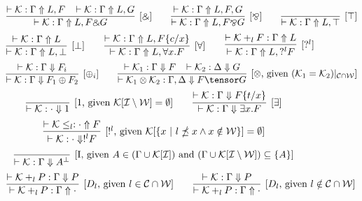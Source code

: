 \begin{figure}[t]
$$
\infer[\text{[$\binampersand$]}]{\vdash \mathcal{K} : \Gamma \Uparrow L, F
\binampersand G}{\vdash \mathcal{K} : \Gamma \Uparrow L, F \;\;\; \vdash
\mathcal{K} : \Gamma \Uparrow L, G}
\qquad
\infer[\text{[$\bindnasrepma$]}]{\vdash \mathcal{K} : \Gamma \Uparrow L, F
\bindnasrepma G}{\vdash \mathcal{K} : \Gamma \Uparrow L, F, G}
\qquad
\infer[\text{[$\top$]}]{\vdash \mathcal{K} : \Gamma \Uparrow L, \top}{}
$$
\vspace{-2.5mm}
$$
\infer[\text{[$\bot$]}]{\vdash \mathcal{K} : \Gamma \Uparrow L,
\bot}{\vdash \mathcal{K} : \Gamma \Uparrow L}
\qquad 
\infer[\text{[$\forall$]}]{\vdash \mathcal{K} : \Gamma \Uparrow L,
\forall x.F}{\vdash \mathcal{K} : \Gamma \Uparrow L, F\{c/x\}}
\qquad 
\infer[\text{[$?^l$]}]{\vdash \mathcal{K} : \Gamma \Uparrow L, ?^l
F}{\vdash \mathcal{K} +_l F : \Gamma \Uparrow L}
$$
\vspace{-2.5mm}
$$
\infer[\text{[$\oplus_i$]}]{\vdash \mathcal{K} : \Gamma \Downarrow F_1
\oplus F_2}{\vdash \mathcal{K} : \Gamma \Downarrow F_i}
\qquad
\infer[\text{[$\otimes$, given $(\mathcal{K}_1 =
\mathcal{K}_2)|_{\mathcal{C} \cap \mathcal{W}}$]}]{\vdash \mathcal{K}_1
\otimes \mathcal{K}_2 : \Gamma, \Delta \Downarrow F \tensor G}{\vdash
\mathcal{K}_1 : \Gamma \Downarrow F \;\;\; \vdash \mathcal{K}_2 : \Delta
\Downarrow G}
$$
\vspace{-2.5mm}
$$
\infer[\text{[1, given $\mathcal{K}[\mathcal{I} \setminus \mathcal{W}] =
\emptyset$]}]{\vdash \mathcal{K} : \cdot \Downarrow 1}{}
\qquad
\infer[\text{[$\exists$]}]{\vdash \mathcal{K} : \Gamma \Downarrow \exists
x.F}{\vdash \mathcal{K} : \Gamma \Downarrow F\{t/x\}}
$$
\vspace{-2.5mm}
$$
\infer[\text{[$!^l$, given $\mathcal{K}[\{x\ |\ l \npreceq x \wedge x
\notin \mathcal{W}\}] = \emptyset$]}]{\vdash \mathcal{K} : \cdot \Downarrow
!^l F}{\vdash \mathcal{K} \leq_l : \cdot \Uparrow F}
$$
\vspace{-2.5mm}
$$
\infer[\text{[I, given $A \in (\Gamma \cup
\mathcal{K}[\mathcal{I}])$ and $(\Gamma \cup \mathcal{K}[\mathcal{I}
\setminus \mathcal{W}]) \subseteq \{A\} $]}]{\vdash \mathcal{K}
: \Gamma \Downarrow A^\bot}{}
$$
\vspace{-2.5mm}
$$
\infer[\text{[$D_l$, given $l \in \mathcal{C} \cap \mathcal{W}$]}]{\vdash
\mathcal{K} +_l P : \Gamma \Uparrow \cdot}{\vdash \mathcal{K} +_l P :
\Gamma \Downarrow P}
\qquad
\infer[\text{[$D_l$, given $l \notin \mathcal{C} \cap
\mathcal{W}$]}]{\vdash \mathcal{K} +_l P : \Gamma \Uparrow \cdot}{\vdash
\mathcal{K} : \Gamma \Downarrow P}
$$
\end{figure}
